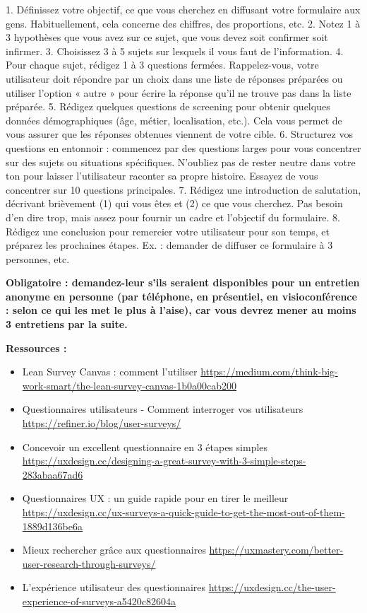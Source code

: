 1. Définissez votre objectif, ce que vous cherchez en diffusant votre formulaire aux gens. Habituellement, cela concerne des chiffres, des proportions, etc.
2. Notez 1 à 3 hypothèses que vous avez sur ce sujet, que vous devez soit confirmer soit infirmer.
3. Choisissez 3 à 5 sujets sur lesquels il vous faut de l'information.
4. Pour chaque sujet, rédigez 1 à 3 questions fermées. Rappelez-vous, votre utilisateur doit répondre par un choix dans une liste de réponses préparées ou utiliser l'option « autre » pour écrire la réponse qu'il ne trouve pas dans la liste préparée.
5. Rédigez quelques questions de screening pour obtenir quelques données démographiques (âge, métier, localisation, etc.). Cela vous permet de vous assurer que les réponses obtenues viennent de votre cible.
6. Structurez vos questions en entonnoir : commencez par des questions larges pour vous concentrer sur des sujets ou situations spécifiques. N'oubliez pas de rester neutre dans votre ton pour laisser l'utilisateur raconter sa propre histoire. Essayez de vous concentrer sur 10 questions principales.
7. Rédigez une introduction de salutation, décrivant brièvement (1) qui vous êtes et (2) ce que vous cherchez. Pas besoin d'en dire trop, mais assez pour fournir un cadre et l'objectif du formulaire.
8. Rédigez une conclusion pour remercier votre utilisateur pour son temps, et préparez les prochaines étapes. Ex. : demander de diffuser ce formulaire à 3 personnes, etc.

\textbf{Obligatoire : demandez-leur s'ils seraient disponibles pour un entretien anonyme en personne (par téléphone, en présentiel, en visioconférence : selon ce qui les met le plus à l'aise), car vous devrez mener au moins 3 entretiens par la suite.}

\textbf{Ressources :}

\begin{itemize}
\item Lean Survey Canvas : comment l'utiliser \url{https://medium.com/think-big-work-smart/the-lean-survey-canvas-1b0a00cab200}
\item Questionnaires utilisateurs - Comment interroger vos utilisateurs \url{https://refiner.io/blog/user-surveys/}
\item Concevoir un excellent questionnaire en 3 étapes simples \url{https://uxdesign.cc/designing-a-great-survey-with-3-simple-steps-283abaa67ad6}
\item Questionnaires UX : un guide rapide pour en tirer le meilleur \url{https://uxdesign.cc/ux-surveys-a-quick-guide-to-get-the-most-out-of-them-1889d136be6a}
\item Mieux rechercher grâce aux questionnaires \url{https://uxmastery.com/better-user-research-through-surveys/}
\item L'expérience utilisateur des questionnaires \url{https://uxdesign.cc/the-user-experience-of-surveys-a5420c82604a}
\end{itemize}

